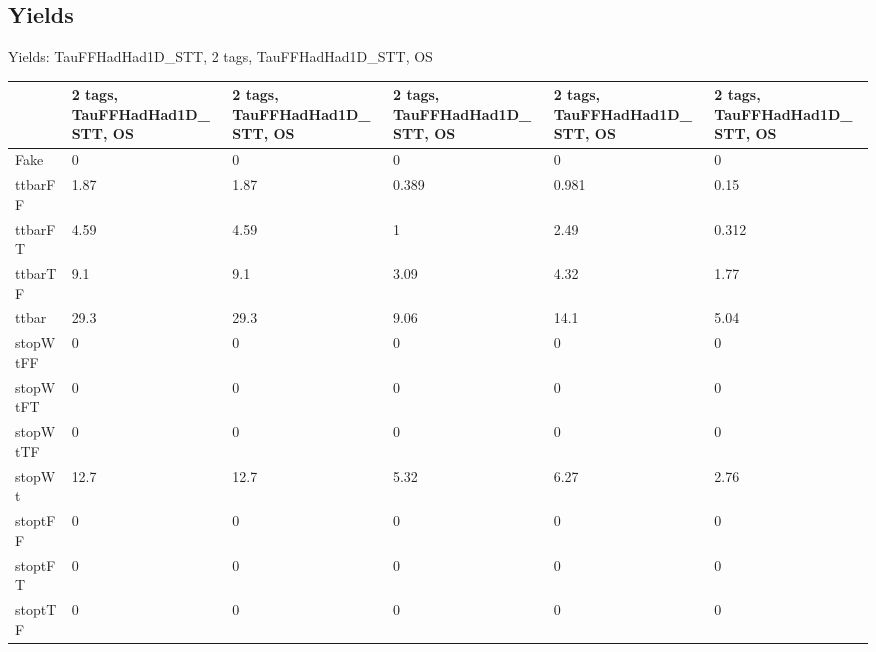 
\subsection{Yields}

\begin{frame}{Yields: TauFFHadHad1D\_STT, 2 tags, TauFFHadHad1D\_STT, OS}
\begin{center}
  \begin{tabular}{l| >{\centering\let\newline\\\arraybackslash\hspace{0pt}}m{1.4cm}| >{\centering\let\newline\\\arraybackslash\hspace{0pt}}m{1.4cm}| >{\centering\let\newline\\\arraybackslash\hspace{0pt}}m{1.4cm}| >{\centering\let\newline\\\arraybackslash\hspace{0pt}}m{1.4cm}| >{\centering\let\newline\\\arraybackslash\hspace{0pt}}m{1.4cm}}
    & 2 tags, TauFFHadHad1D\_STT, OS & 2 tags, TauFFHadHad1D\_STT, OS & 2 tags, TauFFHadHad1D\_STT, OS & 2 tags, TauFFHadHad1D\_STT, OS & 2 tags, TauFFHadHad1D\_STT, OS \\
 \hline \hline
    Fake& 0 & 0 & 0 & 0 & 0 \\
 \hline
    ttbarFF& 1.87 & 1.87 & 0.389 & 0.981 & 0.15 \\
 \hline
    ttbarFT& 4.59 & 4.59 & 1 & 2.49 & 0.312 \\
 \hline
    ttbarTF& 9.1 & 9.1 & 3.09 & 4.32 & 1.77 \\
 \hline
    ttbar& 29.3 & 29.3 & 9.06 & 14.1 & 5.04 \\
 \hline
    stopWtFF& 0 & 0 & 0 & 0 & 0 \\
 \hline
    stopWtFT& 0 & 0 & 0 & 0 & 0 \\
 \hline
    stopWtTF& 0 & 0 & 0 & 0 & 0 \\
 \hline
    stopWt& 12.7 & 12.7 & 5.32 & 6.27 & 2.76 \\
 \hline
    stoptFF& 0 & 0 & 0 & 0 & 0 \\
 \hline
    stoptFT& 0 & 0 & 0 & 0 & 0 \\
 \hline
    stoptTF& 0 & 0 & 0 & 0 & 0 \\

\end{tabular}
\end{center}
\end{frame}

